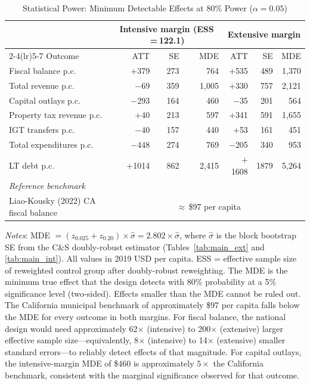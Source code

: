\documentclass[12pt]{article}
\begin{document}
\clearpage


\begin{table}[h!]
\begin{threeparttable}
\caption{Statistical Power: Minimum Detectable Effects at 80\% Power ($\alpha = 0.05$)}
\label{tab:mde}
\centering
\small
\begin{tabular}{lrrrrrr}
\toprule
 & \multicolumn{3}{c}{Intensive margin (ESS\,=\,122.1)} &
   \multicolumn{3}{c}{Extensive margin} \\
\cmidrule(lr){2-4}\cmidrule(lr){5-7}
Outcome & ATT & SE & MDE & ATT & SE & MDE \\
\midrule
Fiscal balance p.c.       & $+$379 & 273 &   764 & $+$535 & 489 & 1{,}370 \\
Total revenue p.c.        & $-$69  & 359 & 1{,}005 & $+$330 & 757 & 2{,}121 \\
Capital outlays p.c.      & $-$293 & 164 &   460 &  $-$35 & 201 &   564   \\
Property tax revenue p.c. &  $+$40 & 213 &   597 & $+$341 & 591 & 1{,}655 \\
IGT transfers p.c.        &  $-$40 & 157 &   440 &  $+$53 & 161 &   451   \\
Total expenditures p.c.   & $-$448 & 274 &   769 & $-$205 & 340 &   953   \\
LT debt p.c.              & $+$1014 & 862 & 2{,}415 & $+$1608 & 1879 & 5{,}264 \\
\addlinespace
\textit{Reference benchmark} \\
\quad Liao-Kousky (2022) CA fiscal balance & \multicolumn{6}{c}{$\approx$\,\$97 per capita} \\
\bottomrule
\end{tabular}
\begin{tablenotes}[flushleft]
\small
\item \textit{Notes}: MDE $= (z_{0.025} + z_{0.20}) \times \hat{\sigma} = 2.802 \times \hat{\sigma}$,
where $\hat{\sigma}$ is the block bootstrap SE from the C\&S doubly-robust estimator
(Tables~\ref{tab:main_ext} and \ref{tab:main_int}).
All values in 2019 USD per capita. ESS = effective sample size of reweighted
control group after doubly-robust reweighting. The MDE is the minimum true effect
that the design detects with 80\% probability at a 5\% significance level (two-sided).
Effects smaller than the MDE cannot be ruled out. The \citet{liao2022} California
municipal benchmark of approximately \$97 per capita falls below the MDE for every
outcome in both margins. For fiscal balance, the national design would need
approximately 62$\times$ (intensive) to 200$\times$ (extensive) larger effective
sample size---equivalently, 8$\times$ (intensive) to 14$\times$ (extensive) smaller
standard errors---to reliably detect effects of that magnitude. For capital outlays,
the intensive-margin MDE of \$460 is approximately $5\times$ the California benchmark,
consistent with the marginal significance observed for that outcome.
\end{tablenotes}
\end{threeparttable}
\end{table}
\end{document}
